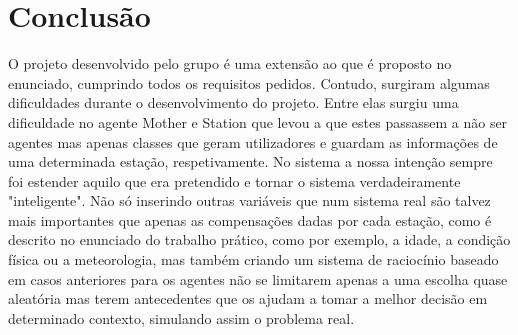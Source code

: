 \section{Conclusão}\label{sec:Conclusion}

O projeto desenvolvido pelo grupo é uma extensão ao que é proposto no enunciado, cumprindo todos os requisitos pedidos. Contudo, surgiram algumas dificuldades durante o desenvolvimento do projeto. Entre elas surgiu uma dificuldade no agente Mother e Station que levou a que estes passassem a não ser agentes mas apenas classes que geram utilizadores e guardam as informações de uma determinada estação, respetivamente.
No sistema a nossa intenção sempre foi estender aquilo que era pretendido e tornar o sistema verdadeiramente "inteligente". Não só inserindo outras variáveis que num sistema real são talvez mais importantes que apenas as compensações dadas por cada estação, como é descrito no enunciado do trabalho prático, como por exemplo, a idade, a condição física ou a meteorologia, mas também criando um sistema de raciocínio baseado em casos anteriores para os agentes não se limitarem apenas a uma escolha quase aleatória mas terem antecedentes que os ajudam a tomar a melhor decisão em determinado contexto, simulando assim o problema real.
